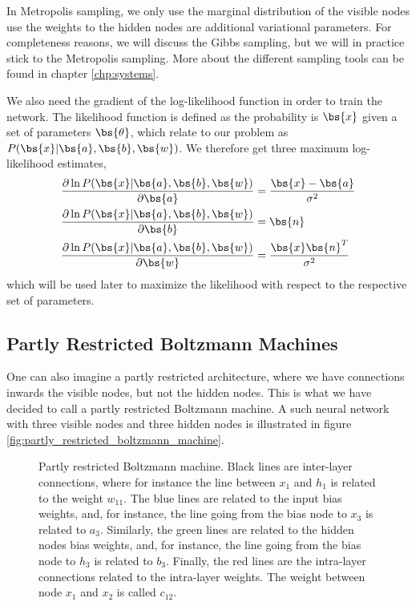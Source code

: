 In Metropolis sampling, we only use the marginal distribution of the visible nodes use the weights to the hidden nodes are additional variational parameters. For completeness reasons, we will discuss the Gibbs sampling, but we will in practice stick to the Metropolis sampling. More about the different sampling tools can be found in chapter \ref{chp:systems}.

We also need the gradient of the log-likelihood function in order to train the network. The likelihood function is defined as the probability is $\bs{x}$ given a set of parameters $\bs{\theta}$, which relate to our problem as $P(\bs{x}|\bs{a},\bs{b},\bs{w})$. We therefore get three maximum log-likelihood estimates,
\begin{align}
\frac{\partial\ln P(\bs{x}|\bs{a},\bs{b},\bs{w})}{\partial\bs{a}}&=\frac{\bs{x}-\bs{a}}{\sigma^2}\\
\frac{\partial\ln P(\bs{x}|\bs{a},\bs{b},\bs{w})}{\partial\bs{b}}&=\bs{n}\\
\frac{\partial\ln P(\bs{x}|\bs{a},\bs{b},\bs{w})}{\partial\bs{w}}&=\frac{\bs{x}\bs{n}^T}{\sigma^2}
\end{align}
which will be used later to maximize the likelihood with respect to the respective set of parameters. 

\subsection{Partly Restricted Boltzmann Machines}
One can also imagine a partly restricted architecture, where we have connections inwards the visible nodes, but not the hidden nodes. This is what we have decided to call a partly restricted Boltzmann machine. A such neural network with three visible nodes and three hidden nodes is illustrated in figure \eqref{fig:partly_restricted_boltzmann_machine}.

\begin{figure} [H]
	\centering
	
	\caption{Partly restricted Boltzmann machine. Black lines are inter-layer connections, where for instance the line between $x_1$ and $h_1$ is related to the weight $w_{11}$. The blue lines are related to the input bias weights, and, for instance, the line going from the bias node to $x_3$ is related to $a_3$. Similarly, the green lines are related to the hidden nodes bias weights, and, for instance, the line going from the bias node to $h_3$ is related to $b_3$. Finally, the red lines are the intra-layer connections related to the intra-layer weights. The weight between node $x_1$ and $x_2$ is called $c_{12}$. }
	\label{fig:partly_restricted_boltzmann_machine}
\end{figure}

